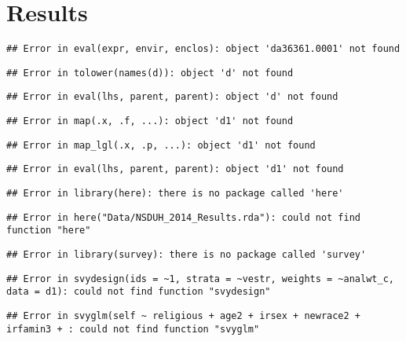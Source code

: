 \documentclass[]{DissertateUSU}
\begin{document}
\section{Results}\label{results}

\begin{verbatim}
## Error in eval(expr, envir, enclos): object 'da36361.0001' not found
\end{verbatim}

\begin{verbatim}
## Error in tolower(names(d)): object 'd' not found
\end{verbatim}

\begin{verbatim}
## Error in eval(lhs, parent, parent): object 'd' not found
\end{verbatim}

\begin{verbatim}
## Error in map(.x, .f, ...): object 'd1' not found
\end{verbatim}

\begin{verbatim}
## Error in map_lgl(.x, .p, ...): object 'd1' not found
\end{verbatim}

\begin{verbatim}
## Error in eval(lhs, parent, parent): object 'd1' not found
\end{verbatim}

\begin{verbatim}
## Error in library(here): there is no package called 'here'
\end{verbatim}

\begin{verbatim}
## Error in here("Data/NSDUH_2014_Results.rda"): could not find function "here"
\end{verbatim}

\begin{verbatim}
## Error in library(survey): there is no package called 'survey'
\end{verbatim}

\begin{verbatim}
## Error in svydesign(ids = ~1, strata = ~vestr, weights = ~analwt_c, data = d1): could not find function "svydesign"
\end{verbatim}

\begin{verbatim}
## Error in svyglm(self ~ religious + age2 + irsex + newrace2 + irfamin3 + : could not find function "svyglm"
\end{verbatim}
\end{document}
